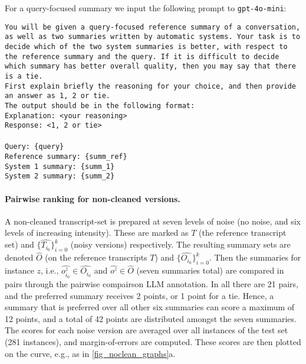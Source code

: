 For a query-focused summary we input the following prompt to \texttt{gpt-4o-mini}:

\begin{tcolorbox}[colback=gray!10, colframe=gray!50, sharp corners, boxrule=0.5mm]
\texttt{You will be given a query-focused reference summary of a conversation, as well as two summaries written by automatic systems. Your task is to decide which of the two system summaries is better, with respect to the reference summary and the query. If it is difficult to decide which summary has better overall quality, then you may say that there is a tie. \\
First explain briefly the reasoning for your choice, and then provide an answer as 1, 2 or tie. \\
The output should be in the following format:\\
Explanation: <your reasoning>\\
Response: <1, 2 or tie>\\\\
Query: \{query\} \\
Reference summary: \{summ\_ref\}\\
System 1 summary: \{summ\_1\}\\
System 2 summary: \{summ\_2\}}
\end{tcolorbox}

\paragraph{Pairwise ranking for non-cleaned versions.}
A non-cleaned transcript-set is prepared at seven levels of noise (no noise, and six levels of increasing intensity). These are marked as $T$ (the reference transcript set) and $\{\widehat{T_{i_0}}\}_{i=0}^k$ (noisy versions) respectively. The resulting summary sets are denoted $\widehat{O}$ (on the reference transcripts $T$) and $\{\widehat{O_{i_0}}\}_{i=0}^k$. Then the summaries for instance $z$, i.e., $\widehat{o_{i_0}^z} \in \widehat{O_{i_0}}$ and $\widehat{o^z} \in \widehat{O}$ (seven summaries total) are compared in pairs through the pairwise compairson LLM annotation. In all there are 21 pairs, and the preferred summary receives 2 points, or 1 point for a tie. Hence, a summary that is preferred over all other six summaries can score a maximum of 12 points, and a total of 42 points are distributed amongst the seven summaries. The scores for each noise version are averaged over all instances of the test set (281 instances), and margin-of-errors are computed. These scores are then plotted on the curve, e.g., as in \autoref{fig_noclean_graphs}a.

